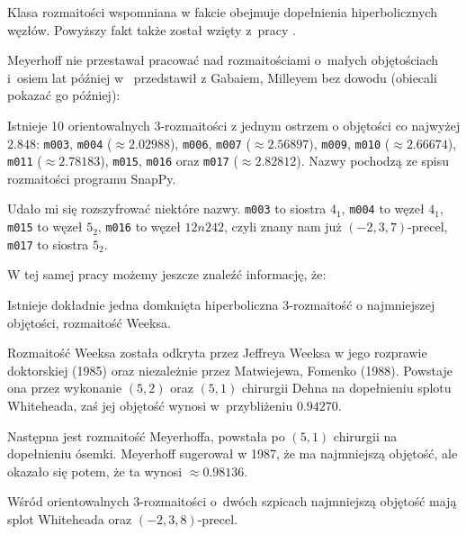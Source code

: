 Klasa rozmaitości wspomniana w fakcie obejmuje dopełnienia hiperbolicznych węzłów.
Powyższy fakt także został wzięty z~pracy \cite{cao01}.

Meyerhoff nie przestawał pracować nad rozmaitościami o~małych objętościach i~osiem lat później w~\cite{meyerhoff09} przedstawił z Gabaiem, Milleyem bez dowodu (obiecali pokazać go później):

\begin{proposition}
    Istnieje 10 orientowalnych 3-rozmaitości z jednym ostrzem o objętości co najwyżej $2.848$: \texttt{m003}, \texttt{m004} ($\approx 2.02988$), \texttt{m006}, \texttt{m007} ($\approx 2.56897$), \texttt{m009}, \texttt{m010} ($\approx 2.66674$), \texttt{m011} ($\approx 2.78183$), \texttt{m015}, \texttt{m016} oraz \texttt{m017} ($\approx 2.82812$).
    Nazwy pochodzą ze spisu rozmaitości programu SnapPy.
\end{proposition}

Udało mi się rozszyfrować niektóre nazwy.
\texttt{m003} to siostra $4_1$, %
\texttt{m004} to węzeł $4_1$, %
\texttt{m015} to węzeł $5_2$,
\texttt{m016} to węzeł $12n242$, czyli znany nam już $(-2, 3, 7)$-precel,
%
\texttt{m017} to siostra $5_2$. %

W tej samej pracy możemy jeszcze znaleźć informację, że:

\begin{proposition}
    Istnieje dokładnie jedna domknięta hiperboliczna 3-rozmaitość o najmniejszej objętości, rozmaitość Weeksa.
\end{proposition}

Rozmaitość Weeksa została odkryta przez Jeffreya Weeksa w jego rozprawie doktorskiej (1985) oraz niezależnie przez Matwiejewa, Fomenko (1988).
Powstaje ona przez wykonanie $(5, 2)$ oraz $(5, 1)$ chirurgii Dehna na dopełnieniu splotu Whiteheada, zaś jej objętość wynosi w~przybliżeniu $0.94270$. %

Następna jest rozmaitość Meyerhoffa, powstała po $(5, 1)$ chirurgii na dopełnieniu ósemki.
Meyerhoff sugerował w 1987, że ma najmniejszą objętość, ale okazało się potem, że ta wynosi $\approx 0.98136$.

\begin{proposition}
    Wśród orientowalnych 3-rozmaitości o~dwóch szpicach najmniejszą objętość mają splot Whiteheada oraz $(-2, 3, 8)$-precel.
%
%
\end{proposition}


